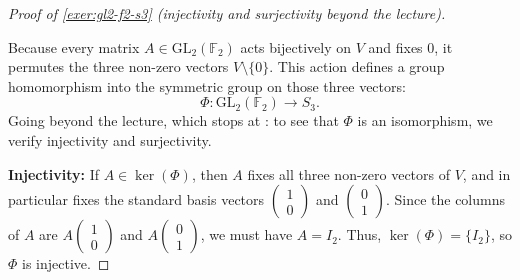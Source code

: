 \begin{content}
\begin{proof}[Proof of \cref{exer:gl2-f2-s3} (injectivity and surjectivity beyond the lecture)]
\begin{center}
\end{center}

Because every matrix $A \in \mathrm{GL}_2(\mathbb{F}_2)$ acts bijectively on $V$ and fixes $0$, it permutes the three non-zero vectors $V \setminus \{0\}$. This action defines a group homomorphism into the symmetric group on those three vectors:
\[
\Phi \colon \mathrm{GL}_2(\mathbb{F}_2) \to S_3.
\]
Going beyond the lecture, which stops at : to see that $\Phi$ is an isomorphism, we verify injectivity and surjectivity.

\textbf{Injectivity:} If $A \in \ker(\Phi)$, then $A$ fixes all three non-zero vectors of $V$, and in particular fixes the standard basis vectors $\begin{pmatrix} 1 \\ 0 \end{pmatrix}$ and $\begin{pmatrix} 0 \\ 1 \end{pmatrix}$. Since the columns of $A$ are $A\begin{pmatrix} 1 \\ 0 \end{pmatrix}$ and $A\begin{pmatrix} 0 \\ 1 \end{pmatrix}$, we must have $A = I_2$. Thus, $\ker(\Phi) = \{I_2\}$, so $\Phi$ is injective.


\end{proof}
\end{content}
